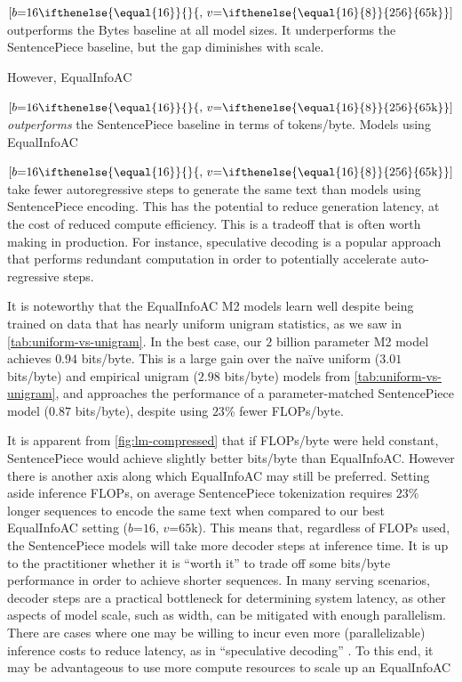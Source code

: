   {$[b\mathord{=}16\ifthenelse{\equal{16}}{}{,\,v\mathord{=}\ifthenelse{\equal{16}{8}}{256}{65\text{k}}}]$} outperforms the Bytes baseline at all model sizes. It underperforms the SentencePiece baseline, but the gap diminishes with scale.

However, EqualInfoAC

  {$[b\mathord{=}16\ifthenelse{\equal{16}}{}{,\,v\mathord{=}\ifthenelse{\equal{16}{8}}{256}{65\text{k}}}]$} \emph{outperforms} the SentencePiece baseline in terms of tokens/byte. Models using EqualInfoAC

  {$[b\mathord{=}16\ifthenelse{\equal{16}}{}{,\,v\mathord{=}\ifthenelse{\equal{16}{8}}{256}{65\text{k}}}]$} take fewer autoregressive steps to generate the same text than models using SentencePiece encoding. This has the potential to reduce generation latency, at the cost of reduced compute efficiency. This is a tradeoff that is often worth making in production. For instance, speculative decoding \cite{leviathan-2023-speculative-decoding} is a popular approach that performs redundant computation in order to potentially accelerate auto-regressive steps.

It is noteworthy that the EqualInfoAC M2 models learn well despite being trained on data that has nearly uniform unigram statistics, as we saw in \ref{tab:uniform-vs-unigram}. In the best case, our $2$ billion parameter M2 model achieves $0.94$ bits/byte. This is a large gain over the naïve uniform ($3.01$ bits/byte) and empirical unigram ($2.98$ bits/byte) models from \ref{tab:uniform-vs-unigram}, and approaches the performance of a parameter-matched SentencePiece model ($0.87$ bits/byte), despite using $23$\% fewer FLOPs/byte.

It is apparent from \ref{fig:lm-compressed} that if FLOPs/byte were held constant, SentencePiece would achieve slightly better bits/byte than EqualInfoAC\@. However there is another axis along which EqualInfoAC may still be preferred. Setting aside inference FLOPs, on average SentencePiece tokenization requires $23$\% longer sequences to encode the same text when compared to our best EqualInfoAC setting ($b\mathord{=}16$, $v\mathord{=}65$k). This means that, regardless of FLOPs used, the SentencePiece models will take more decoder steps at inference time. It is up to the practitioner whether it is ``worth it'' to trade off some bits/byte performance in order to achieve shorter sequences. In many serving scenarios, decoder steps are a practical bottleneck for determining system latency, as other aspects of model scale, such as width, can be mitigated with enough parallelism. There are cases where one may be willing to incur even more (parallelizable) inference costs to reduce latency, as in ``speculative decoding'' \cite{leviathan-2023-speculative-decoding}. To this end, it may be advantageous to use more compute resources to scale up an EqualInfoAC

